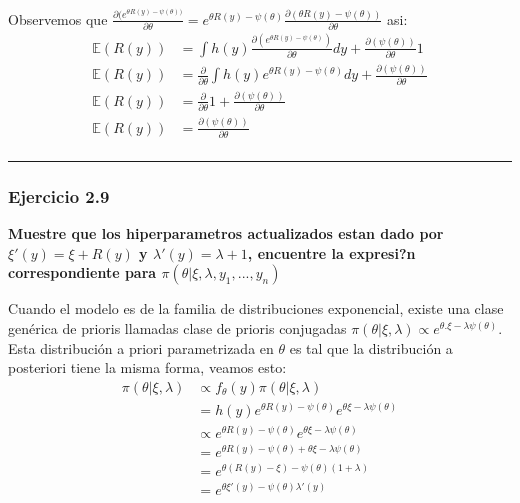 \documentclass[12pt,]{article}
\begin{document}
Observemos que
\(\frac{\partial (e^{\theta R(y)-\psi(\theta))}}{\partial \theta}=e^{\theta R(y)-\psi(\theta)}\frac{\partial (\theta R(y)-\psi(\theta))}{\partial \theta}\)
asi: \[
\begin{array}{rl}
\mathbb{E}(R(y)) & = \displaystyle \int  h(y) \frac{\partial (e^{\theta R(y)-\psi(\theta)})}{\partial \theta} dy +\displaystyle \frac{\partial (\psi(\theta))}{\partial \theta}  1\\
\mathbb{E}(R(y)) & = \displaystyle \frac{\partial}{\partial \theta} \int  h(y)  e^{\theta R(y)-\psi(\theta)} dy +\displaystyle \frac{\partial (\psi(\theta))}{\partial \theta}\\
\mathbb{E}(R(y))& = \displaystyle \frac{\partial}{\partial \theta} 1 +\displaystyle \frac{\partial (\psi(\theta))}{\partial \theta}\\
\mathbb{E}(R(y))& = \displaystyle \frac{\partial (\psi(\theta))}{\partial \theta}\\
\end{array}
\]

\begin{center}\rule{0.5\linewidth}{\linethickness}\end{center}

\subsubsection{Ejercicio 2.9}\label{ejercicio-2.9}

\textbf{Muestre que los hiperparametros actualizados estan dado por
\(\xi'(y) = \xi+R(y)\) y \(\lambda'(y)=\lambda +1\), encuentre la
expresi?n correspondiente para
\(\pi (\theta | \xi, \lambda, y_1,...,y_n)\)}

Cuando el modelo es de la familia de distribuciones exponencial, existe
una clase genérica de prioris llamadas clase de prioris conjugadas
\(\pi (\theta| \xi, \lambda)\propto e^{\theta.\xi -\lambda\psi(\theta)}\).
Esta distribución a priori parametrizada en \(\theta\) es tal que la
distribución a posteriori tiene la misma forma, veamos esto: \[
\begin{array}{rl}
\pi(\theta|\xi, \lambda) & \propto f_\theta(y)\pi(\theta|\xi,\lambda)\\
& = h(y)e^{\theta R(y)-\psi(\theta)} e^{\theta\xi -\lambda\psi(\theta)}\\
& \propto e^{\theta R(y)-\psi(\theta)} e^{\theta\xi -\lambda\psi(\theta)}\\
& = e^{\theta R(y)-\psi(\theta)+\theta\xi -\lambda\psi(\theta)}\\
& = e^{\theta(R(y)-\xi) -\psi(\theta)(1+\lambda)}\\
& = e^{\theta\xi'(y) -\psi(\theta)\lambda'(y)}
\end{array}
\]
\end{document}
